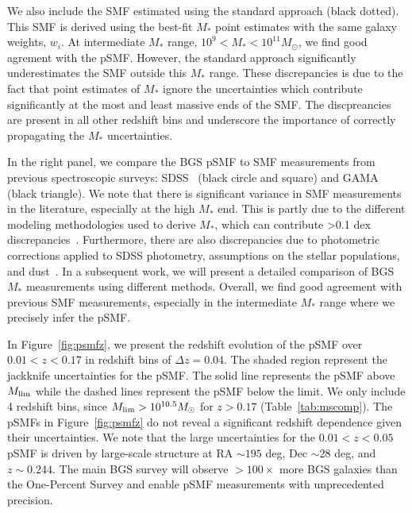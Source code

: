 We also include the SMF estimated using the standard approach (black dotted). 
This SMF is derived using the best-fit $M_*$ point estimates with the same
galaxy weights, $w_i$. 
At intermediate $M_*$ range, $10^9 < M_* < 10^{11}M_\odot$, we find good
agrement with the pSMF. 
However, the standard approach significantly underestimates the SMF outside
this $M_*$ range. 
These discrepancies is due to the fact that point estimates of $M_*$ ignore the
uncertainties which contribute significantly at the most and least massive ends
of the SMF.
The discpreancies are present in all other redshift bins and underscore the
importance of correctly propagating the $M_*$ uncertainties. 

In the right panel, we compare the BGS pSMF to SMF measurements from previous 
spectroscopic surveys: SDSS~\citep{moustakas2013, bernardi2017} (black circle
and square) and GAMA~\citep{driver2022} (black triangle).
We note that there is significant variance in SMF measurements in the
literature, especially at the high $M_*$ end. 
This is partly due to the different modeling methodologies used to derive
$M_*$, which can contribute >0.1 dex discrepancies~\citep{pacifici2023}. 
Furthermore, there are also discrepancies due to photometric corrections
applied to SDSS photometry, assumptions on the stellar populations, and
dust~\citep{bernardi2017}.
In a subsequent work, we will present a detailed comparison of BGS $M_*$
measurements using different methods. 
Overall, we find good agreement with previous SMF measurements, especially in
the intermediate $M_*$ range where we precisely infer the pSMF.  

In Figure~\ref{fig:psmfz}, we present the redshift evolution of the pSMF over 
$0.01 < z < 0.17$ in redshift bins of $\Delta z = 0.04$. 
The shaded region represent the jackknife uncertainties for the pSMF.
The solid line represents the pSMF above $M_{\rm lim}$ while the dashed lines
represent the pSMF below the limit. 
We only include 4 redshift bins, since $M_{\rm lim} > 10^{10.5}M_\odot$ for 
$z > 0.17$ (Table~\ref{tab:mscomp}).
The pSMFs in Figure~\ref{fig:psmfz} do not reveal a significant redshift
dependence given their uncertainties. 
We note that the large uncertainties for the $0.01 < z < 0.05$ pSMF is driven
by large-scale structure at RA $\sim 195$ deg, Dec $\sim 28$ deg, and 
$z\sim0.244$. 
The main BGS survey will observe $>100\times$ more BGS galaxies than the
One-Percent Survey and enable pSMF measurements with unprecedented precision. 

